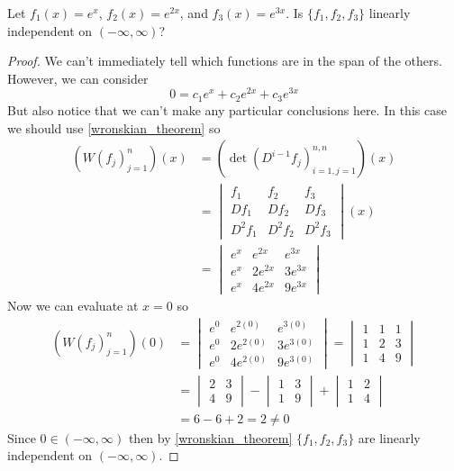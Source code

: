 \documentclass[notes]{subfiles}
\begin{document}
\begin{exercise}
    Let $f_1(x) = e^x$, $f_2(x) = e^{2x}$, and $f_3(x) = e^{3x}$. Is $\{ f_1, f_2, f_3 \}$ linearly independent on $(-\infty, \infty)$?
\end{exercise}
\begin{proof}
    We can't immediately tell which functions are in the span of the others. However, we can consider
    \[
        0 = c_1e^x + c_2e^{2x} + c_3e^{3x}
    \]
    But also notice that we can't make any particular conclusions here. In this case we should use \cref{wronskian_theorem} so
    \begin{align*}
        (W(f_j)_{j = 1}^n)(x)
        &= (\det(D^{i - 1}f_j)_{i = 1, j = 1}^{n, n})(x) \\
        &= \begin{vmatrix}
            f_1 & f_2 & f_3 \\
            Df_1 & Df_2 & Df_3 \\
            D^2f_1 & D^2f_2 & D^2f_3
        \end{vmatrix}(x) \\
        &= \begin{vmatrix}
            e^x & e^{2x} & e^{3x} \\
            e^x & 2e^{2x} & 3e^{3x} \\
            e^x & 4e^{2x} & 9e^{3x}
        \end{vmatrix}
    \end{align*}
    Now we can evaluate at $x = 0$ so
    \begin{align*}
        (W(f_j)_{j = 1}^n)(0)
        &= \begin{vmatrix}
            e^0 & e^{2(0)} & e^{3(0)} \\
            e^0 & 2e^{2(0)} & 3e^{3(0)} \\
            e^0 & 4e^{2(0)} & 9e^{3(0)}
        \end{vmatrix}
        = \begin{vmatrix}
            1 & 1 & 1 \\
            1 & 2 & 3 \\
            1 & 4 & 9
        \end{vmatrix} \\
        &= \begin{vmatrix}
            2 & 3 \\
            4 & 9
        \end{vmatrix}
        - \begin{vmatrix}
            1 & 3 \\
            1 & 9
        \end{vmatrix}
        + \begin{vmatrix}
            1 & 2 \\
            1 & 4
        \end{vmatrix} \\
        &= 6 - 6 + 2 = 2 \neq 0
    \end{align*}
    Since $0 \in (-\infty, \infty)$ then by \cref{wronskian_theorem} $\{ f_1, f_2, f_3 \}$ are linearly independent on $(-\infty, \infty)$.
\end{proof}
\end{document}
